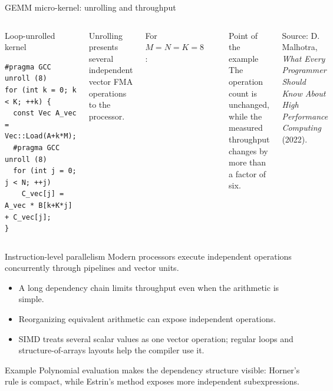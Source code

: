 \documentclass[aspectratio=169,11pt]{beamer}
\begin{document}
\begin{frame}[fragile]{GEMM micro-kernel: unrolling and throughput}
\small
\begin{columns}[T]
\begin{block}{Loop-unrolled kernel}
\tiny\ttfamily
\begin{verbatim}
#pragma GCC unroll (8)
for (int k = 0; k < K; ++k) {
  const Vec A_vec = Vec::Load(A+k*M);
  #pragma GCC unroll (8)
  for (int j = 0; j < N; ++j)
    C_vec[j] = A_vec * B[k+K*j] + C_vec[j];
}
\end{verbatim}
\end{block}
\vspace{-0.2em}
Unrolling presents several independent vector FMA operations to the processor.

For $M=N=K=8$:
\begin{center}
\end{center}
\begin{block}{Point of the example}
The operation count is unchanged, while the measured throughput changes by
more than a factor of six.
\end{block}
\scriptsize
Source: D. Malhotra, \textit{What Every Programmer Should Know About High
Performance Computing} (2022).
\end{columns}
\end{frame}

\begin{frame}{Instruction-level parallelism}
\small
Modern processors execute independent operations concurrently through
pipelines and vector units.
\begin{itemize}
  \item A long dependency chain limits throughput even when the arithmetic is
        simple.
  \item Reorganizing equivalent arithmetic can expose independent operations.
  \item SIMD treats several scalar values as one vector operation; regular
        loops and structure-of-arrays layouts help the compiler use it.
\end{itemize}
\begin{block}{Example}
Polynomial evaluation makes the dependency structure visible: Horner's rule
is compact, while Estrin's method exposes more independent subexpressions.
\end{block}
\end{frame}
\end{document}
